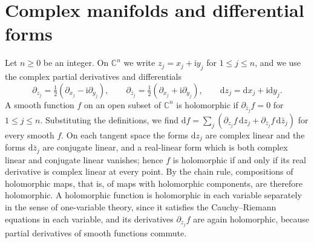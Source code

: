 \section{Complex manifolds and differential forms}
\label{sec:complex-exterior-calculus}

Let $n\geq0$ be an integer. On $\mathbb{C}^n$ we write $z_j=x_j+\mathrm{i}y_j$ for $1\leq j\leq n$, and we use the complex partial derivatives and differentials
\[
 \partial_{z_j}=\tfrac12(\partial_{x_j}-\mathrm{i}\partial_{y_j}),\qquad
 \partial_{\bar z_j}=\tfrac12(\partial_{x_j}+\mathrm{i}\partial_{y_j}),\qquad
 \mathrm{d}z_j=\mathrm{d}x_j+\mathrm{i}\mathrm{d}y_j.
\]
A smooth function $f$ on an open subset of $\mathbb{C}^n$ is holomorphic if $\partial_{\bar z_j}f=0$ for $1\leq j\leq n$. Substituting the definitions, we find $\mathrm df=\sum_j(\partial_{z_j}f\,\mathrm dz_j+\partial_{\bar z_j}f\,\mathrm d\bar z_j)$ for every smooth $f$. On each tangent space the forms $\mathrm dz_j$ are complex linear and the forms $\mathrm d\bar z_j$ are conjugate linear, and a real-linear form which is both complex linear and conjugate linear vanishes; hence $f$ is holomorphic if and only if its real derivative is complex linear at every point. By the chain rule, compositions of holomorphic maps, that is, of maps with holomorphic components, are therefore holomorphic. A holomorphic function is holomorphic in each variable separately in the sense of one-variable theory, since it satisfies the Cauchy--Riemann equations in each variable, and its derivatives $\partial_{z_j}f$ are again holomorphic, because partial derivatives of smooth functions commute.

